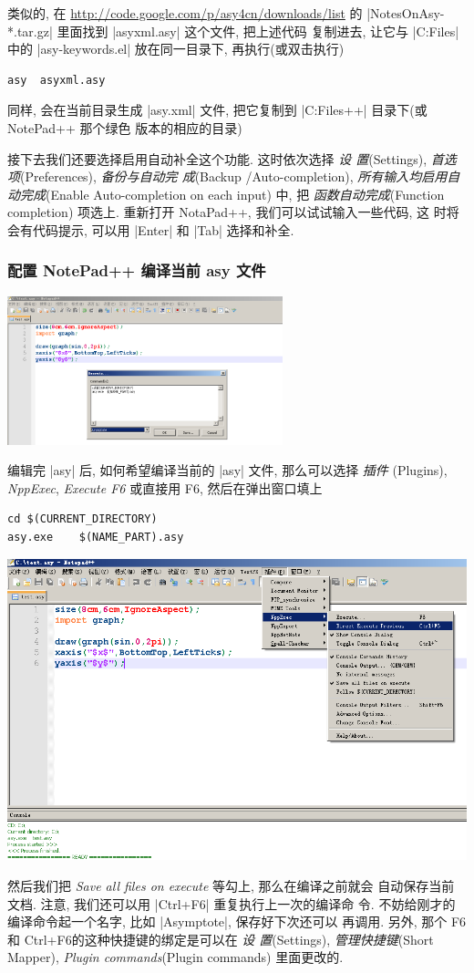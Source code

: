 \documentclass{ctexbook}
\begin{document}
类似的, 在 \url{http://code.google.com/p/asy4cn/downloads/list}
的 |NotesOnAsy-*.tar.gz| 里面找到 |asyxml.asy| 这个文件, 把上述代码
复制进去, 让它与 |C:\Program Files\Asymptote| 中的 |asy-keywords.el|
放在同一目录下, 再执行(或双击执行)
\begin{verbatim}
asy  asyxml.asy
\end{verbatim}
同样, 会在当前目录生成 |asy.xml| 文件, 把它复制到
|C:\Program Files\Notepad++\plugins\APIs| 目录下(或 NotePad++ 那个绿色
版本的相应的目录)

接下去我们还要选择启用自动补全这个功能. 这时依次选择  \emph{设
  置}(Settings), \emph{首选项}(Preferences), \emph{备份与自动完
  成}(Backup /Auto-completion), \emph{所有输入均启用自动完成}(Enable
Auto-completion on each input) 中, 把 \emph{函数自动完成}(Function
completion) 项选上. 重新打开 NotaPad++, 我们可以试试输入一些代码, 这
时将会有代码提示, 可以用 |Enter| 和 |Tab| 选择和补全.

\subsubsection{配置 NotePad++ 编译当前 asy 文件}
\begin{center}
  \includegraphics[width=0.6\textwidth]{NotePad++x.png}
\end{center}
编辑完 |asy| 后, 如何希望编译当前的 |asy| 文件, 那么可以选择
\emph{插件 }(Plugins), \emph{NppExec}, \emph{Execute F6} 或直接用 F6,
然后在弹出窗口填上
\begin{verbatim}
cd $(CURRENT_DIRECTORY)
asy.exe    $(NAME_PART).asy
\end{verbatim}
\begin{center}
  \includegraphics[width=0.6\linewidth]{NotePad++y.png}
\end{center}
然后我们把 \emph{Save all files on execute} 等勾上, 那么在编译之前就会
自动保存当前文档. 注意, 我们还可以用 |Ctrl+F6| 重复执行上一次的编译命
令. 不妨给刚才的编译命令起一个名字, 比如 |Asymptote|, 保存好下次还可以
再调用. 另外, 那个 F6 和 Ctrl+F6的这种快捷键的绑定是可以在 \emph{设
  置}(Settings), \emph{管理快捷键}(Short Mapper), \emph{Plugin
  commands}(Plugin commands) 里面更改的.
\end{document}
